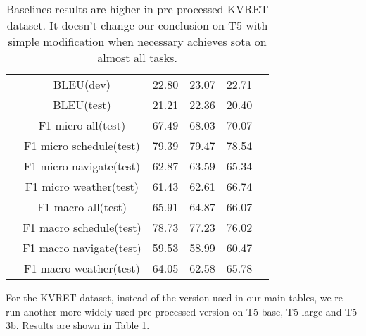 \documentclass[11pt]{article}
\begin{document}
\begin{table}[ht]
\begin{adjustbox}{width=\columnwidth}
\begin{tabular}{@{}lccccc@{}}
			\midrule
            & BLEU(dev) & 22.80 & 23.07 & 22.71 \\
            & BLEU(test) & 21.21 & 22.36 & 20.40 \\
            & F1 micro all(test) & 67.49 & 68.03 & 70.07 \\
            & F1 micro schedule(test) & 79.39 & 79.47 & 78.54 \\
            & F1 micro navigate(test) & 62.87 & 63.59 & 65.34\\
            & F1 micro weather(test) & 61.43 & 62.61 & 66.74 \\
            & F1 macro all(test) & 65.91 & 64.87 & 66.07 \\
            & F1 macro schedule(test) & 78.73 & 77.23 & 76.02 \\
            & F1 macro navigate(test) & 59.53 & 58.99 & 60.47 \\
            & F1 macro weather(test) & 64.05 & 62.58 & 65.78 \\
			\bottomrule
		\end{tabular}
	\end{adjustbox}
	\caption{Baselines results are higher in pre-processed KVRET dataset. It doesn't change our conclusion on T5 with simple modification when necessary achieves sota on almost all tasks.}
	\label{tab:kvret-preprocess}
\end{table} For the KVRET dataset, instead of the version used in our main tables, we re-run another more widely used pre-processed version \cite{P18-1136, wu2019global, qin-etal-2020-dynamic} on T5-base, T5-large and T5-3b. Results are shown in Table \ref{tab:kvret-preprocess}. 
\end{document}
